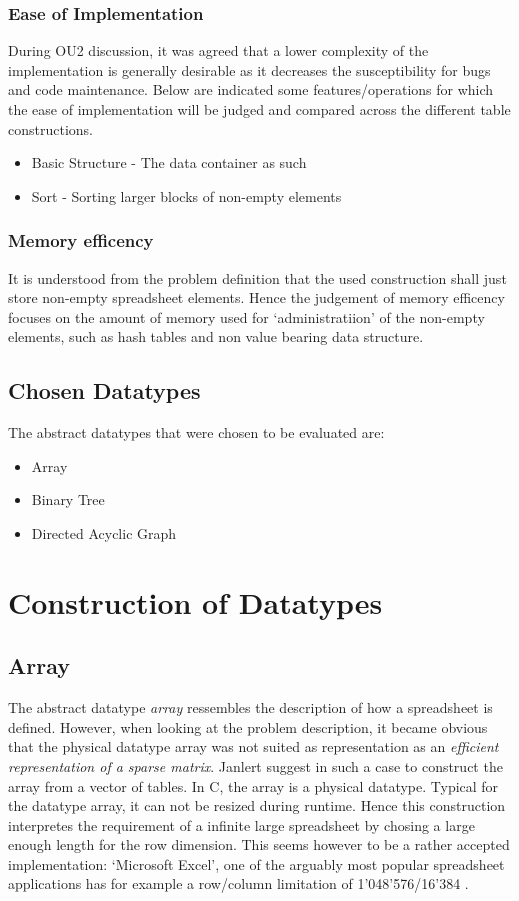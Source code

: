 \documentclass[a4paper,11pt,twoside]{article}
\begin{document}
\subsubsection{Ease of Implementation}
During OU2 discussion, it was agreed that a lower complexity
of the implementation is generally desirable as it decreases the
susceptibility for bugs and code maintenance. Below are indicated some
features/operations for which the ease of implementation will be
judged and compared across the different table constructions.

\begin{itemize}
\item Basic Structure - The data container as such
\item Sort - Sorting larger blocks of non-empty elements
\end{itemize}

\subsubsection{Memory efficency}
It is understood from the problem definition that the used
construction shall just store non-empty spreadsheet elements. Hence
the judgement of memory efficency focuses on the amount of
memory used for `administratiion' of the non-empty elements, such as
hash tables and non value bearing data structure. 


\subsection{Chosen Datatypes}
The abstract datatypes that were chosen to be evaluated are:
\begin{itemize}
\item Array
\item Binary Tree
\item Directed Acyclic Graph
\end{itemize}



\section{Construction of Datatypes}
\subsection{Array}
The abstract datatype \emph{array} ressembles the description of 
how a spreadsheet is defined. However, when looking at the problem 
description, it became obvious that the physical datatype array was 
not suited as representation as an \emph{efficient representation of a
 sparse matrix}. Janlert \cite[pp 101-103]{janlert2000} suggest in
such a case to construct the array from a vector of tables. In C, the
array is a physical datatype. Typical for the datatype array, it can
not be resized during runtime. Hence this construction interpretes the
requirement of a infinite large spreadsheet by chosing a large enough
length for the row dimension. This seems however to be a rather
accepted implementation: `Microsoft Excel', one of the arguably most
popular spreadsheet applications has for example a row/column
limitation of 1'048'576/16'384 \cite{excel_limit}. 
\end{document}
